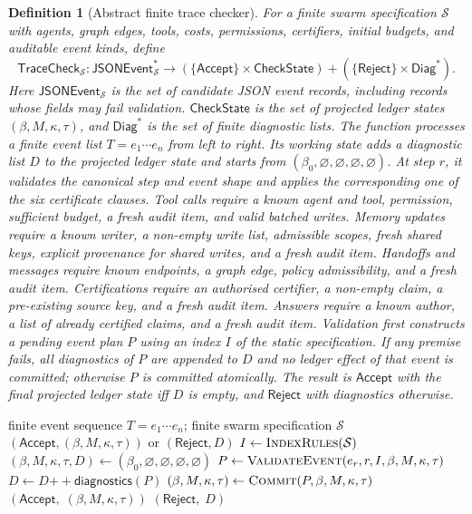 \documentclass[a4paper,fleqn]{cas-sc}
\newtheorem{definition}{Definition}
\newcommand{\Accept}{\mathsf{Accept}}
\newcommand{\TraceCheck}{\mathsf{TraceCheck}}
\begin{document}
\begin{definition}[Abstract finite trace checker]\label{def:tracecheck}
For a finite swarm specification \(\mathcal{S}\) with agents, graph edges, tools, costs, permissions, certifiers, initial budgets, and auditable event kinds, define
\[
  \TraceCheck_{\mathcal{S}}
  : \mathsf{JSONEvent}_{\mathcal{S}}^{*}
  \longrightarrow
  (\{\Accept\}\times\mathsf{CheckState})
  + (\{\mathsf{Reject}\}\times\mathsf{Diag}^{*}).
\]
Here \(\mathsf{JSONEvent}_{\mathcal S}\) is the set of candidate JSON event
records, including records whose fields may fail validation.
\(\mathsf{CheckState}\) is the set of projected
ledger states \((\beta,M,\kappa,\tau)\), and \(\mathsf{Diag}^{*}\) is the set
of finite diagnostic lists. The function processes a finite event list
\(T=e_1\cdots e_n\) from left to right. Its working state adds a diagnostic
list \(D\) to the projected ledger state and starts from
\((\beta_0,\varnothing,\varnothing,\varnothing,\varnothing)\). At step \(r\),
it validates the canonical step and event shape and applies the corresponding
one of the six certificate clauses. Tool calls require a known agent and tool,
permission, sufficient budget, a fresh audit item, and valid batched writes.
Memory updates require a known writer, a non-empty write list, admissible
scopes, fresh shared keys, explicit provenance for shared writes, and a fresh
audit item. Handoffs and messages require known endpoints, a graph edge,
policy admissibility, and a fresh audit item. Certifications require an
authorised certifier, a non-empty claim, a pre-existing source key, and a fresh
audit item. Answers require a known author, a list of already certified claims,
and a fresh audit item. Validation first constructs a pending event plan \(P\)
using an index \(I\) of the static specification. If any premise fails, all
diagnostics of \(P\) are appended to \(D\) and no ledger effect of that event
is committed; otherwise \(P\) is committed atomically. The result is
\(\Accept\) with the final projected ledger state iff \(D\) is empty, and
\(\mathsf{Reject}\) with diagnostics otherwise.
\end{definition}

\begin{algorithm}[t]
\caption{$\TraceCheck_{\mathcal{S}}(T)$: abstract finite trace checker}\label{alg:tracecheck}
\begin{algorithmic}[1]
\Require finite event sequence $T = e_1 \cdots e_n$; finite swarm specification $\mathcal{S}$
\Ensure $(\Accept, (\beta,M,\kappa,\tau))$ or $(\mathsf{Reject}, D)$
\State $I \gets \Call{IndexRules}{\mathcal S}$
\State $(\beta, M, \kappa, \tau, D) \gets (\beta_0, \varnothing, \varnothing, \varnothing, \varnothing)$
  \State $P \gets \Call{ValidateEvent}{e_r,r,I,\beta,M,\kappa,\tau}$
    \State $D \gets D\mathbin{+\!+}\mathsf{diagnostics}(P)$
  \Else
    \State $(\beta,M,\kappa,\tau) \gets \Call{Commit}{P,\beta,M,\kappa,\tau}$
  \EndIf
\EndFor
{}
  \State \Return $(\Accept,\;(\beta,M,\kappa,\tau))$
\Else
  \State \Return $(\mathsf{Reject},\; D)$
\EndIf
\end{algorithmic}
\end{algorithm}
\end{document}

